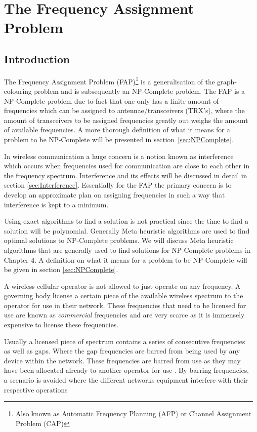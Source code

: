 \chapter{The Frequency Assignment Problem}
\label{chpt:fap}
\section{Introduction}
The Frequency Assignment Problem (FAP)\footnote{Also known as Automatic Frequency Planning (AFP) or Channel Assignment Problem (CAP)\cite{ACOvsEA}} is a generalisation of the graph-colouring problem and is subsequently an NP-Complete problem\cite{FAPRAMColouring}. The FAP is a NP-Complete problem due to fact that one only has a finite amount of frequencies which can be assigned to antennae/transceivers (TRX's), where the amount of transceivers to be assigned frequencies greatly out weighs the amount of available frequencies\cite{FAPRAMColouring}. A more thorough definition of what it means for a problem to be NP-Complete will be presented in section~\ref{sec:NPComplete}.

In wireless communication a huge concern is a notion known as interference which occurs when frequencies used for communication are close to each other in the frequency spectrum\cite{Karen2004}. Interference and its effects will be discussed in detail in section \ref{sec:Interference}. Essentially for the FAP the primary concern is to develop an approximate plan on assigning frequencies in such a way that interference is kept to a minimum. 

Using exact algorithms to find a solution is not practical since the time to find a solution will be polynomial. Generally Meta heuristic algorithms are used to find optimal solutions to NP-Complete problems\cite{ACOvsEA}. We will discuss Meta heuristic algorithms that are generally used to find solutions for NP-Complete problems in Chapter 4. A definition on what it means for a problem to be NP-Complete will be given in section \ref{sec:NPComplete}. 

A wireless cellular operator is not allowed to just operate on any frequency. A governing body license a certain piece of the available wireless spectrum to the operator for use in their network\cite{FAPRAMColouring}. These frequencies that need to be licensed for use are known as \emph{commercial} frequencies and are very scarce as it is immensely expensive to license these frequencies\cite{FAPRAMColouring}. 

Usually a licensed piece of spectrum contains a series of consecutive frequencies as well as gaps. Where the gap frequencies are barred from being used by any device within the network. These frequencies are barred from use as they may have been allocated already to another operator for use \cite{FAPInCell}. By barring frequencies, a scenario is avoided where the different networks equipment interfere with their respective operations \cite{FAPInCell}

